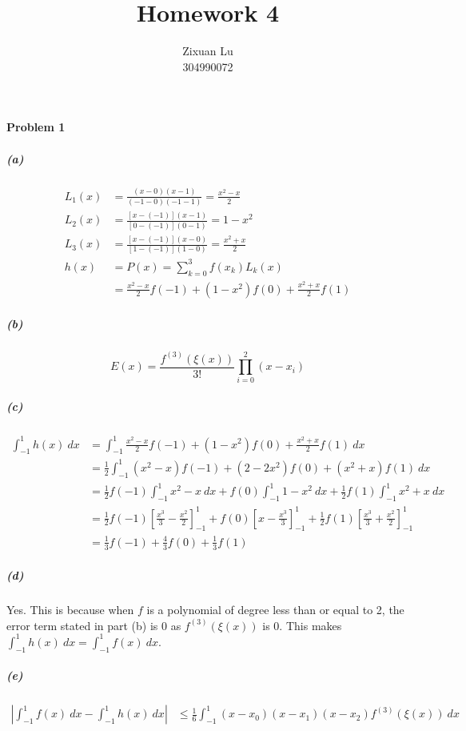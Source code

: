 \documentclass{article}
\author{Zixuan Lu \\ 304990072}
\title{\textbf{Homework 4}}
\begin{document}
\maketitle
\paragraph{Problem 1}
\subparagraph*{(a)} 
\begin{equation}\nonumber
\begin{split}
L_1(x)&=\frac{(x-0)(x-1)}{(-1-0)(-1-1)} = \frac{x^2-x}{2} \\
L_2(x)&=\frac{[x-(-1)](x-1)}{[0-(-1)](0-1)} = 1-x^2 \\
L_3(x)&=\frac{[x-(-1)](x-0)}{[1-(-1)](1-0)} = \frac{x^2+x}{2} \\
h(x) &= P(x) = \sum_{k=0}^{3} f(x_k)L_k(x) \\
&= \frac{x^2-x}{2}f(-1) + (1-x^2)f(0) + \frac{x^2+x}{2}f(1)
\end{split}
\end{equation}

\subparagraph*{(b)}
$$E(x)=\frac{f^{(3)}(\xi(x))}{3!}\prod_{i=0}^{2} (x-x_i)$$ 

\subparagraph*{(c)}
\begin{equation}\nonumber
\begin{split}
\int_{-1}^{1} h(x)\ dx &= \int_{-1}^{1} \frac{x^2-x}{2}f(-1) + (1-x^2)f(0) + \frac{x^2+x}{2}f(1)\ dx \\
&= \frac{1}{2}\int_{-1}^{1} (x^2-x)f(-1) + (2 - 2x^2)f(0) + (x^2 + x)f(1)\ dx \\
&= \frac{1}{2}f(-1)\int_{-1}^{1} x^2-x\ dx + f(0)\int_{-1}^{1}1-x^2\ dx + \frac{1}{2}f(1)\int_{-1}^{1} x^2+x\ dx \\
&= \frac{1}{2}f(-1)[\frac{x^3}{3}-\frac{x^2}{2}]_{-1}^1 + f(0)[x-\frac{x^3}{3}]_{-1}^1 + \frac{1}{2}f(1)[\frac{x^3}{3}+\frac{x^2}{2}]_{-1}^1\\
&= \frac{1}{3}f(-1) + \frac{4}{3}f(0) + \frac{1}{3}f(1)
\end{split}
\end{equation}

\subparagraph*{(d)}
Yes. This is because when $f$ is a polynomial of degree less than or equal to 2, the error term stated in part (b) is $0$ as $f^{(3)}(\xi(x))$ is 0. This makes $\int_{-1}^{1} h(x)\ dx = \int_{-1}^{1} f(x)\ dx$.

\subparagraph*{(e)}
\begin{equation}\nonumber
\begin{split}
|\int_{-1}^{1} f(x)\ dx - \int_{-1}^{1} h(x)\ dx| &\leq \frac{1}{6} \int_{-1}^{1} (x-x_0)(x-x_1)(x-x_2)f^{(3)}(\xi(x))\ dx 
\end{split}
\end{equation} 
\newpage
\end{document}
